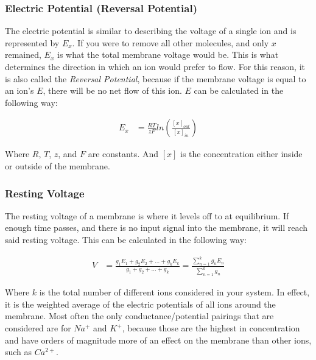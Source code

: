 \documentclass[12pt]{amsart}
\begin{document}
\subsubsection{Electric Potential (Reversal Potential)} The electric potential is similar to describing the voltage of a single ion and is represented by $E_x$. If you were to remove all other molecules, and only $x$ remained, $E_x$ is what the total membrane voltage would be. This is what determines the direction in which an ion would prefer to flow. For this reason, it is also called the \textit{Reversal Potential}, because if the membrane voltage is equal to an ion's $E$, there will be no net flow of this ion. $E$ can be calculated in the following way: 

\medskip

\begin{equation} \label{eq8}
\begin{split}
E_x &= \frac{RT}{zF}ln(\frac{[x]_{out}}{[x]_{in}})
\end{split}
\end{equation}


\medskip

Where $R$, $T$, $z$, and $F$ are constants. And $[x]$ is the concentration either inside or outside of the membrane.

\subsubsection{Resting Voltage} The resting voltage of a membrane is where it levels off to at equilibrium. If enough time passes, and there is no input signal into the membrane, it will reach said resting voltage. This can be calculated in the following way: 

\medskip

\begin{equation} \label{eq8}
\begin{split}
V &= \frac{g_1E_1 + g_2E_2 + ... + g_kE_k}{g_1 + g_2 + ... + g_k} = \frac{\sum_{n=1}^k g_nE_n}{\sum_{n=1}^k g_n}
\end{split}
\end{equation}

\medskip

Where $k$ is the total number of different ions considered in your system. In effect, it is the weighted average of the electric potentials of all ions around the membrane. Most often the only conductance/potential pairings that are considered are for $Na^+$ and $K^+$, because those are the highest in concentration and have orders of magnitude more of an effect on the membrane than other ions, such as $Ca^{2+}$.
\end{document}

